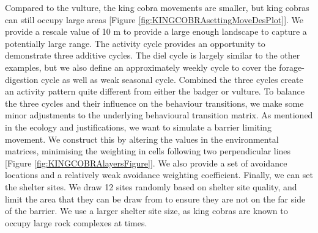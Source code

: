 \documentclass[10pt,a4paper]{article}
\begin{document}
Compared to the vulture, the king cobra movements are smaller, but king cobras can still occupy large areas {[}Figure \ref{fig:KINGCOBRAsettingMoveDesPlot}{]}.
We provide a rescale value of 10 m to provide a large enough landscape to capture a potentially large range.
The activity cycle provides an opportunity to demonstrate three additive cycles.
The diel cycle is largely similar to the other examples, but we also define an approximately weekly cycle to cover the forage-digestion cycle as well as weak seasonal cycle.
Combined the three cycles create an activity pattern quite different from either the badger or vulture.
To balance the three cycles and their influence on the behaviour transitions, we make some minor adjustments to the underlying behavioural transition matrix.
As mentioned in the ecology and justifications, we want to simulate a barrier limiting movement.
We construct this by altering the values in the environmental matrices, minimising the weighting in cells following two perpendicular lines {[}Figure \ref{fig:KINGCOBRAlayersFigure}{]}.
We also provide a set of avoidance locations and a relatively weak avoidance weighting coefficient.
Finally, we can set the shelter sites.
We draw 12 sites randomly based on shelter site quality, and limit the area that they can be draw from to ensure they are not on the far side of the barrier.
We use a larger shelter site size, as king cobras are known to occupy large rock complexes at times.
\end{document}
